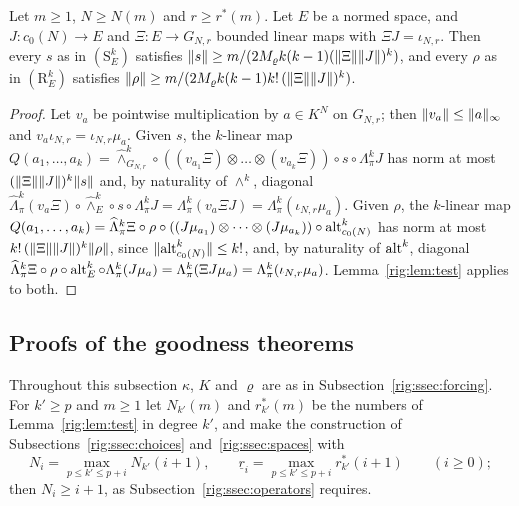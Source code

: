 \begin{corollary}\label{rig:cor:readout}
Let $m\ge1$, $N\ge N(m)$ and $r\ge r^*(m)$. Let $E$ be a normed space, and $J\colon c_0(N)\to E$ and
$\Xi\colon E\to G_{N,r}$ bounded linear maps with $\Xi J=\iota_{N,r}$. Then every $s$ as in $(\mathrm S^k_E)$ satisfies
$\lVert s\rVert\ge m/(2M_\varrho k(k-1)(\lVert \Xi\rVert\lVert J\rVert)^k)$, and every $\rho$ as in $(\mathrm R^k_E)$ satisfies
$\lVert \rho\rVert\ge m/(2M_\varrho k(k-1)k!\,(\lVert \Xi\rVert\lVert J\rVert)^k)$.
\end{corollary}

\begin{proof}
Let $v_a$ be pointwise multiplication by $a\in K^N$ on $G_{N,r}$; then $\lVert v_a\rVert\le\lVert a\rVert_\infty$ and
$v_a\iota_{N,r}=\iota_{N,r}\mu_a$. Given $s$, the $k$\nobreakdash-linear map
$Q(a_1,\dots,a_k)=\widehat\wedge^k_{G_{N,r}}\circ((v_{a_1}\Xi)\otimes\dots\otimes(v_{a_k}\Xi))\circ s\circ\Lambda^k_\pi J$
has norm at most $(\lVert \Xi\rVert\lVert J\rVert)^k\lVert s\rVert$ and, by naturality of $\wedge^k$, diagonal
$\widehat\Lambda^k_\pi(v_a\Xi)\circ\widehat\wedge^k_E\circ s\circ\Lambda^k_\pi J=\Lambda^k_\pi(v_a\Xi J)=\Lambda^k_\pi(\iota_{N,r}\mu_a)$.
Given $\rho$, the $k$\nobreakdash-linear map
$Q(a_1,\dots,a_k)=\widehat\Lambda^k_\pi\Xi\circ\rho\circ((J\mu_{a_1})\otimes\dots\otimes(J\mu_{a_k}))\circ\operatorname{alt}^k_{c_0(N)}$
has norm at most $k!\,(\lVert \Xi\rVert\lVert J\rVert)^k\lVert \rho\rVert$, since $\lVert \operatorname{alt}^k_{c_0(N)}\rVert\le k!$, and, by naturality of
$\operatorname{alt}^k$, diagonal
$\widehat\Lambda^k_\pi\Xi\circ\rho\circ\operatorname{alt}^k_E\circ\Lambda^k_\pi(J\mu_a)=\Lambda^k_\pi(\Xi J\mu_a)=\Lambda^k_\pi(\iota_{N,r}\mu_a)$.
Lemma~\ref{rig:lem:test} applies to both.
\end{proof}

\subsection{Proofs of the goodness theorems}\label{rig:ssec:proofs}

Throughout this subsection $\kappa$, $K$ and $\varrho$ are as in Subsection~\ref{rig:ssec:forcing}. For $k'\ge p$ and
$m\ge1$ let $N_{k'}(m)$ and $r^*_{k'}(m)$ be the numbers of Lemma~\ref{rig:lem:test} in degree $k'$, and make the
construction of Subsections~\ref{rig:ssec:choices} and~\ref{rig:ssec:spaces} with
\begin{equation}\label{rig:eq:choices}
 N_i=\max_{p\le k'\le p+i}N_{k'}(i+1),\qquad\underline r_i=\max_{p\le k'\le p+i}r^*_{k'}(i+1)\qquad(i\ge0);
\end{equation}
then $N_i\ge i+1$, as Subsection~\ref{rig:ssec:operators} requires.

